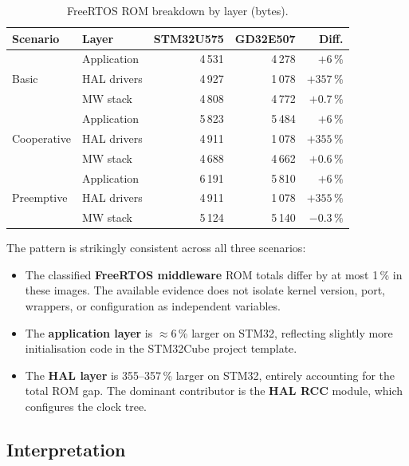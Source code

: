 \begin{table}[H]
  \centering
  \caption{FreeRTOS ROM breakdown by layer (bytes).}
  \label{tab:gd32-freertos-rom}
  \begin{tabular}{l l r r r}
    \toprule
    \textbf{Scenario} & \textbf{Layer} & \textbf{STM32U575} & \textbf{GD32E507}
        & \textbf{Diff.} \\
    \midrule
    \multirow{3}{*}{Basic}
      & Application & 4\,531  & 4\,278 & $+6\,\%$ \\
      & HAL drivers & 4\,927  & 1\,078 & $+357\,\%$ \\
      & MW stack    & 4\,808  & 4\,772 & $+0.7\,\%$ \\
    \midrule
    \multirow{3}{*}{Cooperative}
      & Application & 5\,823  & 5\,484 & $+6\,\%$ \\
      & HAL drivers & 4\,911  & 1\,078 & $+355\,\%$ \\
      & MW stack    & 4\,688  & 4\,662 & $+0.6\,\%$ \\
    \midrule
    \multirow{3}{*}{Preemptive}
      & Application & 6\,191  & 5\,810 & $+6\,\%$ \\
      & HAL drivers & 4\,911  & 1\,078 & $+355\,\%$ \\
      & MW stack    & 5\,124  & 5\,140 & $-0.3\,\%$ \\
    \bottomrule
  \end{tabular}
\end{table}

The pattern is strikingly consistent across all three scenarios:

\begin{itemize}
  \item The classified \textbf{FreeRTOS middleware} ROM totals differ by at most 1\,\%
    in these images. The available evidence does not isolate kernel version, port, wrappers,
    or configuration as independent variables.
  \item The \textbf{application layer} is $\approx$6\,\% larger on STM32, reflecting
    slightly more initialisation code in the STM32Cube project template.
  \item The \textbf{HAL layer} is 355--357\,\% larger on STM32, entirely accounting for
    the total ROM gap. The dominant contributor is the \textbf{HAL RCC} module, which
    configures the clock tree.
\end{itemize}

\subsection{Interpretation}
\label{sec:gd32-freertos-interp}

